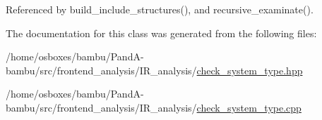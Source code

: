 Referenced by build\+\_\+include\+\_\+structures(), and recursive\+\_\+examinate().



The documentation for this class was generated from the following files\+:\begin{DoxyCompactItemize}
\item 
/home/osboxes/bambu/\+Pand\+A-\/bambu/src/frontend\+\_\+analysis/\+I\+R\+\_\+analysis/\hyperlink{check__system__type_8hpp}{check\+\_\+system\+\_\+type.\+hpp}\item 
/home/osboxes/bambu/\+Pand\+A-\/bambu/src/frontend\+\_\+analysis/\+I\+R\+\_\+analysis/\hyperlink{check__system__type_8cpp}{check\+\_\+system\+\_\+type.\+cpp}\end{DoxyCompactItemize}
